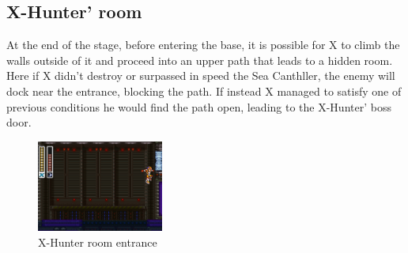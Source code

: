 \subsection{X-Hunter' room}
At the end of the stage, before entering the base, it is possible for X to climb the walls outside of it and proceed into an upper path that leads to a hidden room. Here if X didn't destroy or surpassed in speed the Sea Canthller, the enemy will dock near the entrance, blocking the path. If instead X managed to satisfy one of previous conditions he would find the path open, leading to the X-Hunter' boss door.

\begin{figure}[htp]
	\centering
	\includegraphics[height=3cm]{figures/X2/Bubble_crab/Crab_Hunter_room.png}
	\caption{X-Hunter room entrance}
\end{figure}

